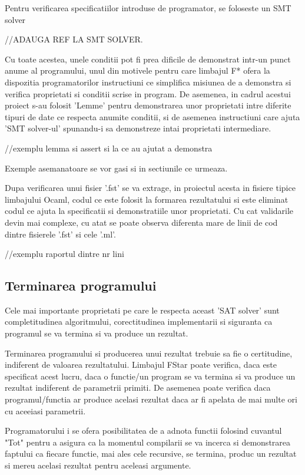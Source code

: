 Pentru verificarea specificatiilor introduse de programator, se foloseste un SMT solver 

//ADAUGA REF LA SMT SOLVER. 

Cu toate acestea, unele conditii pot fi prea dificile de demonstrat intr-un punct anume al programului, unul din motivele pentru care limbajul F* ofera la dispozitia programatorilor  instructiuni ce simplifica misiunea de a demonstra si verifica proprietati si conditii scrise in program. De asemenea, in cadrul acestui proiect s-au folosit 'Lemme' pentru demonstrarea unor proprietati intre diferite tipuri de date ce respecta anumite conditii, si de asemenea instructiuni care ajuta 'SMT solver-ul' spunandu-i sa demonstreze intai proprietati intermediare.

//exemplu lemma si assert si la ce au ajutat a demonstra

Exemple asemanatoare se vor gasi si in sectiunile ce urmeaza.

Dupa verificarea unui fisier '.fst' se va extrage, in proiectul acesta in fisiere tipice limbajului Ocaml, codul ce este folosit la formarea rezultatului si este eliminat codul ce ajuta la specificatii si demonstratiile unor proprietati. Cu cat validarile devin mai complexe, cu atat se poate observa diferenta mare de linii de cod dintre fisierele '.fst' si cele '.ml'.

//exemplu raportul dintre nr lini

\subsection{Terminarea programului}

Cele mai importante proprietati pe care le respecta aceast 'SAT solver' sunt completitudinea algoritmului, corectitudinea implementarii si siguranta ca programul se va termina si va produce un rezultat.

Terminarea programului si producerea unui rezultat trebuie sa fie o certitudine, indiferent de valoarea rezultatului. Limbajul FStar poate verifica, daca este specificat acest lucru, daca o functie/un program se va termina si va produce un rezultat indiferent de parametrii primiti. De asemenea poate verifica daca programul/functia ar produce acelasi rezultat daca ar fi apelata de mai multe ori cu aceeiasi parametrii.

Programatorului i se ofera posibilitatea de a adnota functii folosind cuvantul "Tot" pentru a asigura ca la momentul compilarii se va incerca si demonstrarea faptului ca fiecare functie, mai ales cele recursive, se termina, produc un rezultat si mereu acelasi rezultat pentru aceleasi argumente. 

